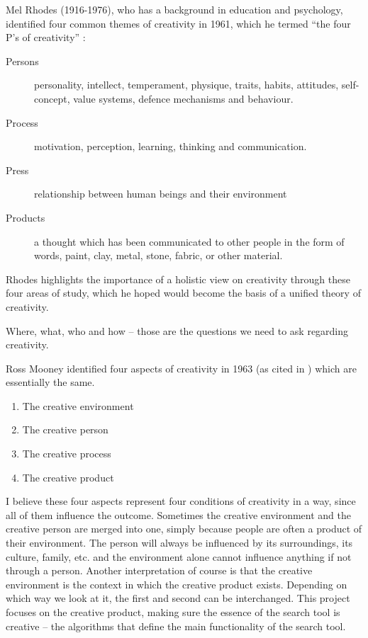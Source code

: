 Mel Rhodes (1916-1976), who has a background in education and psychology, identified four common themes of creativity in 1961, which he termed ``the four P’s of creativity'' \citep{Rhodes1961}:

\begin{description}
  \item [Persons] personality, intellect, temperament, physique, traits, habits, attitudes, self-concept, value systems, defence mechanisms and behaviour.
  \item [Process] motivation, perception, learning, thinking and communication.
  \item [Press] relationship between human beings and their environment
  \item [Products] a thought which has been communicated to other people in the form of words, paint, clay, metal, stone, fabric, or other material.
\end{description}

Rhodes highlights the importance of a holistic view on creativity through these four areas of study, which he hoped would become the basis of a unified theory of creativity.

\begin{draft}
  Where, what, who and how – those are the questions we need to ask regarding creativity.
\end{draft}

Ross Mooney identified four aspects of creativity in 1963 (as cited in \citep{Sternberg1999}) which are essentially the same.

\begin{enumerate}
  \item The creative environment
  \item The creative person
  \item The creative process
  \item The creative product
\end{enumerate}


\begin{draft}
  I believe these four aspects represent four conditions of creativity in a way, since all of them influence the outcome. Sometimes the creative environment and the creative person are merged into one, simply because people are often a product of their environment. The person will always be influenced by its surroundings, its culture, family, etc. and the environment alone cannot influence anything if not through a person. Another interpretation of course is that the creative environment is the context in which the creative product exists. Depending on which way we look at it, the first and second can be interchanged. This project focuses on the creative product, making sure the essence of the search tool is creative – the algorithms that define the main functionality of the search tool.
\end{draft}

